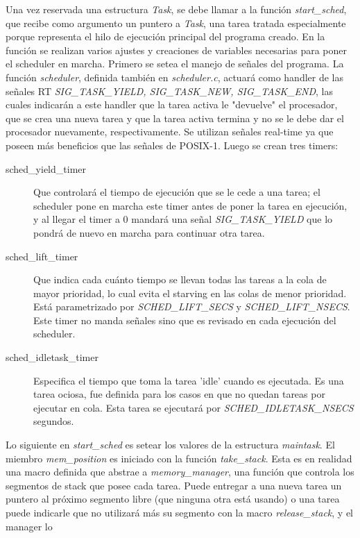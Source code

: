 \documentclass[a4paper]{article}
\begin{document}
Una vez reservada una estructura \textit{Task}, se debe llamar a la
función \textit{start\_sched}, que recibe como argumento un puntero
a \textit{Task}, una tarea tratada especialmente porque representa
el hilo de ejecución principal del programa creado. En la función
se realizan varios ajustes y creaciones de variables necesarias
para poner el scheduler en marcha. Primero se setea el manejo de
señales del programa. La función \textit{scheduler},
definida también en \textit{scheduler.c}, actuará como handler de
las señales RT \textit{SIG\_TASK\_YIELD, SIG\_TASK\_NEW, SIG\_TASK\_END},
las cuales indicarán a este handler que la tarea activa le "devuelve"
el procesador, que se crea una nueva tarea y que la tarea activa
termina y no se le debe dar el procesador nuevamente, respectivamente.
Se utilizan señales real-time ya que poseen más beneficios que las
señales de POSIX-1. Luego se crean tres timers:
\begin{description}
    \item[sched\_yield\_timer]Que controlará el tiempo de ejecución que se
    le cede a una tarea; el scheduler pone en marcha este timer antes
    de poner la tarea en ejecución, y al llegar el timer a 0 mandará
    una señal \textit{SIG\_TASK\_YIELD} que lo pondrá de nuevo en marcha
    para continuar otra tarea.
    \item[sched\_lift\_timer] Que indica cada cu\'anto tiempo se llevan
    todas las tareas a la cola de mayor prioridad, lo cual evita el
    starving en las colas de menor prioridad. Est\'a parametrizado por
    \textit{SCHED\_LIFT\_SECS} y \textit{SCHED\_LIFT\_NSECS}. Este timer
    no manda señales sino que es revisado en cada ejecuci\'on del
    scheduler.
    \item[sched\_idletask\_timer] Especifica el tiempo que toma la tarea
    'idle' cuando es ejecutada. Es una tarea ociosa, fue definida para
    los casos en que no quedan tareas por ejecutar en cola. Esta tarea
    se ejecutar\'a por \textit{SCHED\_IDLETASK\_NSECS} segundos.
\end{description}
Lo siguiente en \textit{start\_sched} es setear los valores de la
estructura \textit{maintask}. El miembro \textit{mem\_position} es
iniciado con la función \textit{take\_stack}. Esta es en realidad una
macro definida que abstrae a \textit{memory\_manager}, una función que
controla los segmentos de stack que posee cada tarea. Puede
entregar a una nueva tarea un puntero al próximo segmento libre (que
ninguna otra está usando) o una tarea puede indicarle que no utilizará
más su segmento con la macro \textit{release\_stack}, y el manager lo
\end{document}
